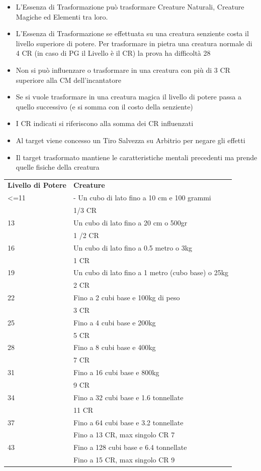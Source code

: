 \documentclass[a4paper,11pt,twoside,openany]{book}
\begin{document}
\begin{itemize}
	\item
	      L'Essenza di Trasformazione può trasformare Creature Naturali, Creature Magiche ed Elementi tra loro.
	\item
	      L'Essenza di Trasformazione se effettuata su una creatura senziente costa il livello superiore di potere. Per trasformare in pietra una creatura normale di 4 CR (in caso di PG il Livello è il CR) la prova ha difficoltà 28
	\item
	      Non si può influenzare o trasformare in una creatura con più di 3 CR superiore alla CM dell'incantatore
	\item
	      Se si vuole trasformare in una creatura magica il livello di potere passa a quello successivo (e si somma con il costo della senziente)
	\item
	      I CR indicati si riferiscono alla somma dei CR influenzati
	\item
	      Al target viene concesso un Tiro Salvezza su Arbitrio per negare gli effetti
	\item
	      Il target trasformato mantiene le caratteristiche mentali precedenti
	      ma prende quelle fisiche della creatura
\end{itemize}

\bigskip

\begin{tabularx}{0.95\textwidth}{lX}
	\toprule
	\textbf{Livello di Potere} & \textbf{Creature}\\
	<=11   & - Un cubo di lato fino a 10 cm e 100 grammi  \\
	  & 1/3 CR    \\
	13& Un cubo di lato fino a 20 cm o 500gr  \\
	  & 1 /2 CR   \\
	16& Un cubo di lato fino a 0.5 metro o 3kg  \\
	  & 1 CR \\
	19& Un cubo di lato fino a 1 metro (cubo base) o 25kg \\
	  & 2 CR \\
	22& Fino a 2 cubi base e 100kg di peso \\
	  & 3 CR \\
	25& Fino a 4 cubi base e 200kg    \\
	  & 5 CR \\
	28& Fino a 8 cubi base e 400kg    \\
	  & 7 CR \\
	31& Fino a 16 cubi base e 800kg   \\
	  & 9 CR \\
	34& Fino a 32 cubi base e 1.6 tonnellate    \\
	  & 11 CR\\
	37& Fino a 64 cubi base e 3.2 tonnellate    \\
	  & Fino a 13 CR, max singolo CR 7\\
	43& Fino a 128 cubi base e 6.4 tonnellate   \\
	  & Fino a 15 CR, max singolo CR 9\\
\end{tabularx}
\end{document}
